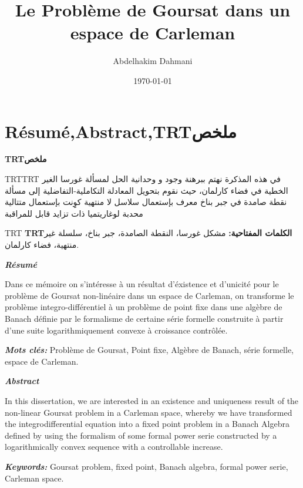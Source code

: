 \documentclass[12pt,a4paper]{report}
\author{Abdelhakim Dahmani}
\title{Le Problème de Goursat dans un espace de Carleman }
\date{\today}
\newcommand{\textarabic}[1]     %
       {\bgroup\textdir TRT\arabicfont #1\egroup}
\newenvironment{Arabic}     %
   {\textdir TRT\pardir TRT\arabicfont}{}
\theoremstyle{plain}
\theoremstyle{definition}
\theoremstyle{remark}
\begin{document}
   
   
   
   
   
   
\chapter*{Résumé,Abstract,\textarabic{ملخص}}

\setcounter{page}{3}


\begin{center}
\textbf{\textarabic{ملخص}}
\end{center}

\begin{Arabic}
في هذه المذكرة نهتم ببرهنة وجود و وحدانية الحل لمسألة غورسا الغير الخطية في فضاء كارلمان، حيث نقوم بتحويل المعادلة التكاملية-التفاضلية إلى مسألة نقطة صامدة في جبر بناخ معرف بإستعمال سلاسل لا منتهية كوِِنت بإستعمال متتالية محدبة لوغاريتميا ذات تزايد قابل  للمراقبة  
 \hfill
 \end{Arabic}
 

\textarabic{  \textbf{\textarabic{الكلمات المفتاحية:}}
 مشكل غورسا، النقطة الصامدة، جبر بناخ، سلسلة غير منتهية،  فضاء كارلمان. \hfill }




\begin{center}
\textbf{\textit{Résumé}}
\end{center}

Dans ce mémoire on s'intéresse à un résultat d'éxistence et d'unicité pour le problème de Goursat non-linéaire dans un espace de Carleman, on transforme le problème integro-différentiel à un problème de point fixe dans une algèbre de Banach définie par le formalisme de certaine série formelle construite à partir d'une suite logarithmiquement convexe à croissance contrôlée. 

\textbf{\textit{Mots clés:}} Problème de Goursat, Point fixe, Algèbre de Banach, série formelle, espace de Carleman.
\begin{center}
\textbf{\textit{Abstract}}
\end{center}
 In this dissertation, we are interested in an existence and uniqueness result of the non-linear Goursat problem in a Carleman space, whereby we have transformed the integrodifferential equation  into a fixed point problem in a Banach Algebra defined by using the formalism of some formal power serie constructed by a logarithmically convex sequence with a controllable increase.  

\textbf{\textit{Keywords:}} Goursat problem, fixed point, Banach algebra, formal power serie, Carleman space.


\thispagestyle{plain}

   
\end{document}
